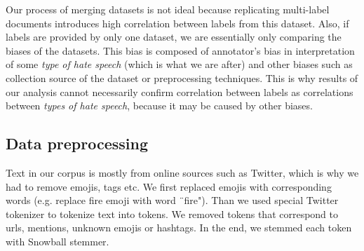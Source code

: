 \documentclass[fleqn,moreauthors,10pt]{ds_report}
\begin{document}
Our process of merging datasets is not ideal because replicating multi-label documents introduces high correlation between labels from this dataset. Also, if labels are provided by only one dataset, we are essentially only comparing the biases of the datasets. This bias is composed of annotator's bias in interpretation of some \textit{type of hate speech} (which is what we are after) and other biases such as collection source of the dataset or preprocessing techniques. This is why results of our analysis cannot necessarily confirm correlation between labels as correlations between \textit{types of hate speech}, because it may be caused by other biases.

\subsection*{Data preprocessing}
Text in our corpus is mostly from online sources such as Twitter, which is why we had to remove emojis, tags etc. We first replaced emojis with corresponding words (e.g. replace fire emoji with word ¨fire"). Than we used special Twitter tokenizer to tokenize text into tokens. We removed tokens that correspond to urls, mentions, unknown emojis or hashtags. In the end, we stemmed each token with Snowball stemmer.



\end{document}
